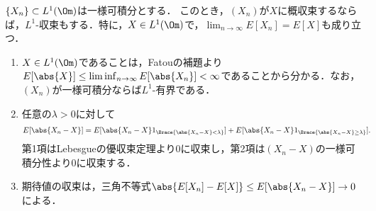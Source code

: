 \documentclass[uplatex,dvipdfmx]{jsreport}
\begin{document}
\begin{proposition}
    $\{X_n\}\subset L^1(\Om)$は一様可積分とする．
    このとき，$(X_n)$が$X$に概収束するならば，$L^1$-収束もする．特に，$X\in L^1(\Om)$で，$\lim_{n\to\infty}E[X_n]=E[X]$も成り立つ．
\end{proposition}
\begin{Proof}\mbox{}
    \begin{enumerate}
        \item $X\in L^1(\Om)$であることは，Fatouの補題より$E[\abs{X}]\le\liminf_{n\to\infty}E[\abs{X_n}]<\infty$であることから分かる．なお，$(X_n)$が一様可積分ならば$L^1$-有界である．
        \item 任意の$\lambda>0$に対して
        \begin{align*}
            E[\abs{X_n-X}]&=E[\abs{X_n-X}1_{\Brace{\abs{X_n-X}<\lambda}}]+E[\abs{X_n-X}1_{\Brace{\abs{X_n-X}\ge\lambda}}].
        \end{align*}
        第1項はLebesgueの優収束定理より$0$に収束し，第2項は$(X_n-X)$の一様可積分性より$0$に収束する．
        \item 期待値の収束は，三角不等式$\abs{E[X_n]-E[X]}\le E[\abs{X_n-X}]\to0$による．
    \end{enumerate}
\end{Proof}
\end{document}
